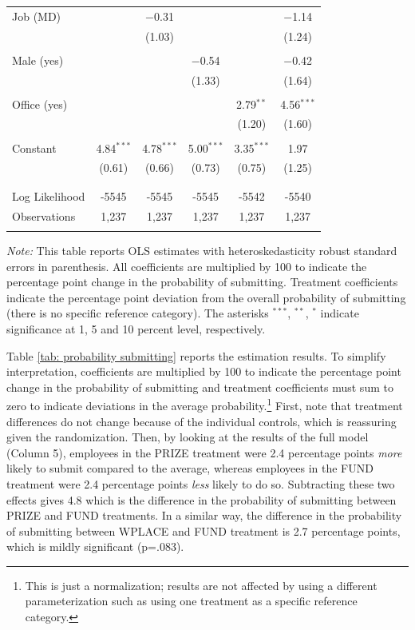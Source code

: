 \documentclass[12pt, titlepage]{article}
\begin{document}
\begin{table}
\begin{tabular}{@{\extracolsep{5pt}}lccccc}
 Job (MD) &  & $-$0.31 &  &  & $-$1.14 \\ 
  &  & (1.03) &  &  & (1.24) \\ 
  & & & & & \\ 
 Male (yes) &  &  & $-$0.54 &  & $-$0.42 \\ 
  &  &  & (1.33) &  & (1.64) \\ 
  & & & & & \\ 
 Office (yes) &  &  &  & 2.79$^{**}$ & 4.56$^{***}$ \\ 
  &  &  &  & (1.20) & (1.60) \\ 
  & & & & & \\ 
 Constant & 4.84$^{***}$ & 4.78$^{***}$ & 5.00$^{***}$ & 3.35$^{***}$ & 1.97 \\ 
  & (0.61) & (0.66) & (0.73) & (0.75) & (1.25) \\ 
  & & & & & \\ 
\hline \\[-1.8ex] 
Log Likelihood & -5545 & -5545 & -5545 & -5542 & -5540 \\ 
Observations & 1,237 & 1,237 & 1,237 & 1,237 & 1,237 \\ 
\hline 
\hline \\[-1.8ex] 
\end{tabular} 
\begin{minipage}{\textwidth}
\emph{Note:} This table reports OLS estimates with heteroskedasticity robust standard errors in parenthesis. All coefficients are multiplied by 100 to indicate the percentage point change in the probability of submitting. Treatment coefficients indicate the percentage point deviation from the overall probability of submitting (there is no specific reference category). The asterisks $^{\ast\ast\ast}$, $^{\ast\ast}$, $^{\ast}$ indicate significance at 1, 5 and 10 percent level, respectively.
\end{minipage}\end{table}

Table \ref{tab: probability submitting} reports the estimation results.
To simplify interpretation, coefficients are multiplied by 100 to
indicate the percentage point change in the probability of submitting
and treatment coefficients must sum to zero to indicate deviations in
the average probability.\footnote{This is just a normalization; results
  are not affected by using a different parameterization such as using
  one treatment as a specific reference category.} First, note that
treatment differences do not change because of the individual controls,
which is reassuring given the randomization. Then, by looking at the
results of the full model (Column 5), employees in the PRIZE treatment
were 2.4 percentage points \emph{more} likely to submit compared to the
average, whereas employees in the FUND treatment were 2.4 percentage
points \emph{less} likely to do so. Subtracting these two effects gives
4.8 which is the difference in the probability of submitting between
PRIZE and FUND treatments. In a similar way, the difference in the
probability of submitting between WPLACE and FUND treatment is 2.7
percentage points, which is mildly significant (p=.083).
\end{document}
